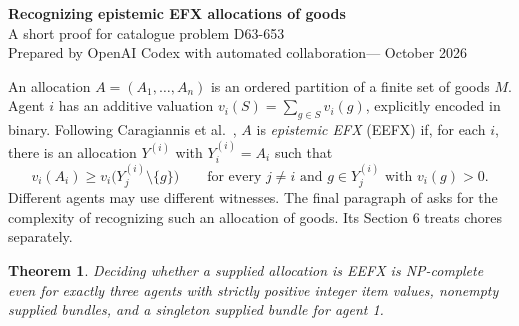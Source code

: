 \documentclass[11pt]{article}
\newtheorem{theorem}{Theorem}
\begin{document}
\begin{center}
{\Large\bfseries Recognizing epistemic EFX allocations of goods}\\[5pt]
{\small A short proof for catalogue problem D63-653}\\[3pt]
{\small Prepared by OpenAI Codex with automated collaboration\quad--- October 2026}
\end{center}

An allocation $A=(A_1,\ldots,A_n)$ is an ordered partition of a finite
set of goods $M$. Agent $i$ has an additive valuation
$v_i(S)=\sum_{g\in S}v_i(g)$, explicitly encoded in binary.
Following Caragiannis et al.~\cite[Definitions 1--2]{fairness},
$A$ is \emph{epistemic EFX} (EEFX) if, for each $i$, there is an allocation
$Y^{(i)}$ with $Y^{(i)}_i=A_i$ such that
\[
 v_i(A_i)\geq v_i\bigl(Y^{(i)}_j\setminus\{g\}\bigr)
 \qquad\text{for every }j\ne i\text{ and }g\in Y^{(i)}_j
 \text{ with }v_i(g)>0.
\]
Different agents may use different witnesses. The final paragraph of
\cite[Section 4]{fairness} asks for the complexity of recognizing such an
allocation of goods. Its Section 6 treats chores separately.

\begin{theorem}
Deciding whether a supplied allocation is EEFX is NP-complete even for
exactly three agents with strictly positive integer item values, nonempty
supplied bundles, and a singleton supplied bundle for agent 1.
\end{theorem}
\end{document}
